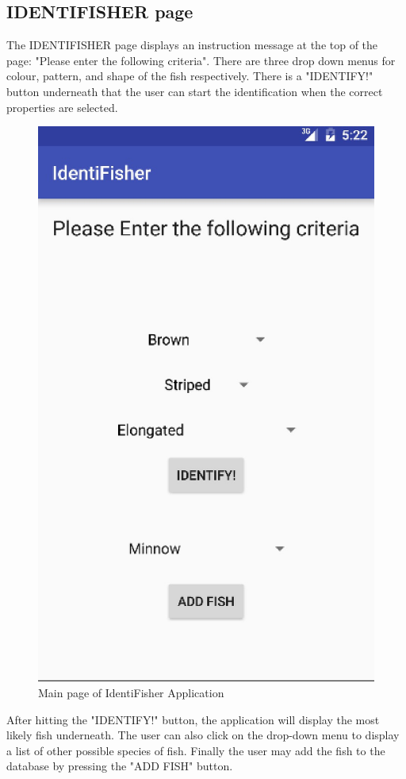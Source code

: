\documentclass{article}
\begin{document}
\subsection{IDENTIFISHER page}
The IDENTIFISHER page displays an instruction message at the top of the page: "Please enter the following criteria". There are three
drop down menus for colour, pattern, and shape of the fish respectively. There is a "IDENTIFY!" button underneath that the user can
start the identification when the correct properties are selected.
\begin{figure}[H]
	\includegraphics[scale=0.30]{IdentiFisher.png}
	\caption{Main page of IdentiFisher Application}
\end{figure}
After hitting the "IDENTIFY!" button, the application will display the most likely fish underneath. The user can also click on the drop-down
menu to display a list of other possible species of fish. Finally the user may add the fish to the database by pressing the "ADD FISH" button.

\newpage
\listoffigures
\end{document}
